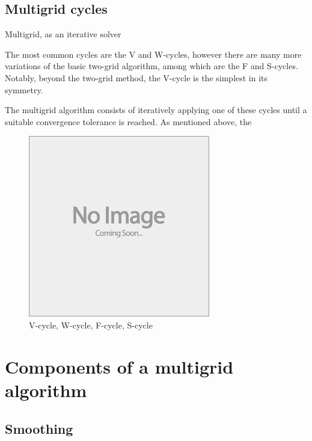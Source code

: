 
\subsection{Multigrid cycles}

Multigrid, as an iterative solver

The most common cycles are the V and W-cycles, however there are many more variations of the basic two-grid algorithm, among which are the F and S-cycles.
Notably, beyond the two-grid method, the V-cycle is the simplest in its symmetry.

The multigrid algorithm consists of iteratively applying one of these cycles until a suitable convergence tolerance is reached.
As mentioned above, the 



\begin{figure}
	\includegraphics[draft]{images/placeholder}
	\caption{V-cycle, W-cycle, F-cycle, S-cycle}
\end{figure}









\section{Components of a multigrid algorithm}

\subsection{Smoothing}


